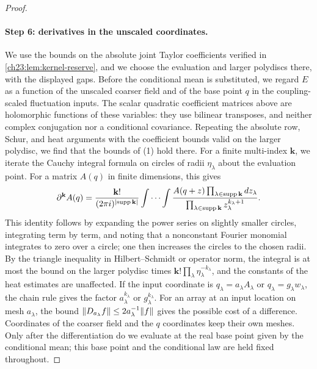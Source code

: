 \begin{proof}
\paragraph{Step 6: derivatives in the unscaled coordinates.}
We use the bounds on the absolute joint Taylor coefficients verified in \cref{ch23:lem:kernel-reserve}, and we choose the evaluation and larger polydiscs there, with the displayed gaps. Before the conditional mean is substituted, we regard $E$ as a function of the unscaled coarser field and of the base point $q$ in the coupling-scaled fluctuation inputs. The scalar quadratic coefficient matrices above are holomorphic functions of these variables: they use bilinear transposes, and neither complex conjugation nor a conditional covariance. Repeating the absolute row, Schur, and heat arguments with the coefficient bounds valid on the larger polydisc, we find that the bounds of (1) hold there. For a finite multi-index $\mathbf k$, we iterate the Cauchy integral formula on circles of radii $\eta_\lambda$ about the evaluation point. For a matrix $A(q)$ in finite dimensions, this gives
\[
 \partial^{\mathbf k}A(q)=\frac{\mathbf k!}{(2\pi i)^{\lvert \operatorname{supp}\mathbf k\rvert}}\int\cdots\int\frac{A(q+z)\prod_{\lambda\in\operatorname{supp}\mathbf k}dz_\lambda}{\prod_{\lambda\in\operatorname{supp}\mathbf k}z_\lambda^{k_\lambda+1}}.
\]
This identity follows by expanding the power series on slightly smaller circles, integrating term by term, and noting that a nonconstant Fourier monomial integrates to zero over a circle; one then increases the circles to the chosen radii. By the triangle inequality in Hilbert--Schmidt or operator norm, the integral is at most the bound on the larger polydisc times $\mathbf k!\prod_\lambda\eta_\lambda^{-k_\lambda}$, and the constants of the heat estimates are unaffected. If the input coordinate is $q_\lambda=a_\lambda A_\lambda$ or $q_\lambda=g_\lambda w_\lambda$, the chain rule gives the factor $a_\lambda^{k_\lambda}$ or $g_\lambda^{k_\lambda}$. For an array at an input location on mesh $a_\lambda$, the bound $\lVert D_{a_\lambda}f\rVert\le2a_\lambda^{-1}\lVert f\rVert$ gives the possible cost of a difference. Coordinates of the coarser field and the $q$ coordinates keep their own meshes. Only after the differentiation do we evaluate at the real base point given by the conditional mean; this base point and the conditional law are held fixed throughout.


\end{proof}
